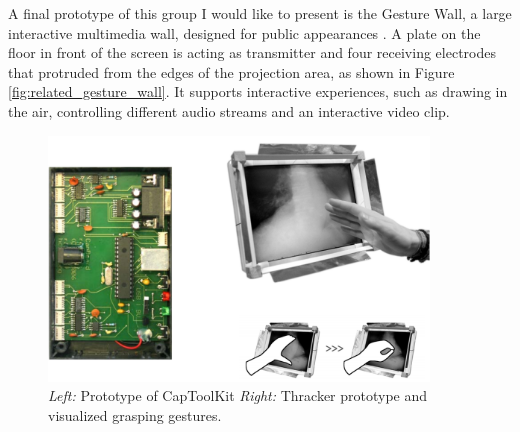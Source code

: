 A final prototype of this group I would like to present is the Gesture Wall, a large interactive multimedia wall, designed for public appearances \cite{smith1998electric}. A plate on the floor in front of the screen is acting as transmitter and four receiving electrodes that protruded from the edges of the projection area, as shown in Figure \ref{fig:related_gesture_wall}. It supports interactive experiences, such as drawing in the air, controlling different audio streams and an interactive video clip.
\begin{figure}[h]
\centering
\includegraphics[width=0.9\textwidth]{images/related_ctk_thracker}
\caption{\emph{Left:} Prototype of CapToolKit  \cite{Wimmer2007a} \emph{Right:} Thracker prototype and visualized grasping gestures. \cite{Wimmer2006}}
\label{fig:related_ctk_thracker}
\end{figure}


